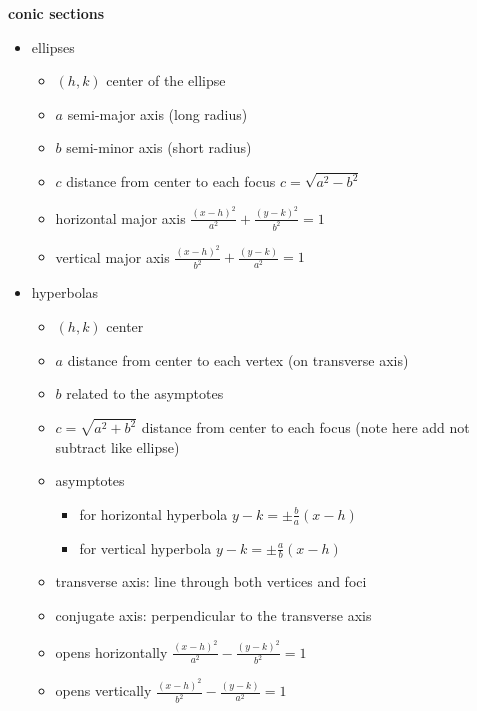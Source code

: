 \documentclass{article}
\begin{document}
\textbf{conic sections}
	\begin{itemize}
		\item ellipses
			\begin{itemize}
				\item $(h, k)$ center of the ellipse
				\item $a$ semi-major axis (long radius)
				\item $b$ semi-minor axis (short radius)
				\item $c$ distance from center to each focus $c = \sqrt{a^2 - b^2}$
			\end{itemize}
			\begin{itemize}
				\item horizontal major axis $\frac{(x - h)^2}{a^2} + \frac{(y - k)^2}{b^2} = 1$
				\item vertical major axis $\frac{(x - h)^2}{b^2} + \frac{(y - k)}{a^2} = 1$
			\end{itemize}

		\item hyperbolas
			\begin{itemize}
				\item $(h, k)$ center
				\item $a$ distance from center to each vertex (on transverse axis) 
				\item $b$ related to the asymptotes
				\item $c = \sqrt{a^2 + b^2}$ distance from center to each focus (note here add not subtract like ellipse)
				\item asymptotes
					\begin{itemize}
						\item for horizontal hyperbola $y - k = \pm\frac{b}{a}(x - h)$
						\item for vertical hyperbola $y - k = \pm\frac{a}{b}(x - h)$
					\end{itemize}
				\item transverse axis: line through both vertices and foci
				\item conjugate axis: perpendicular to the transverse axis
			\end{itemize}
			\begin{itemize}
				\item opens horizontally $\frac{(x - h)^2}{a^2} - \frac{(y - k)^2}{b^2} = 1$  
				\item opens vertically $\frac{(x - h)^2}{b^2} - \frac{(y - k)}{a^2} = 1$ 
			\end{itemize}
	\end{itemize}
\end{document}
